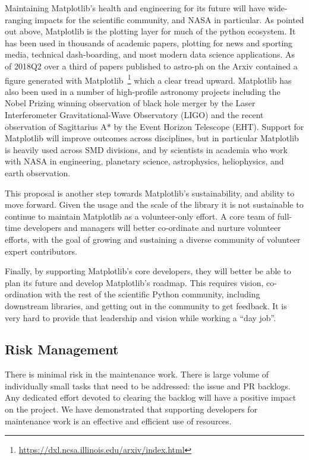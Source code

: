 \documentclass[12pt]{article}
\numberwithin{page}{section}
\begin{document}
Maintaining Matplotlib's health and engineering for its future will
have wide-ranging impacts for the scientific community, and NASA in
particular.  As pointed out above, Matplotlib is the plotting layer
for much of the python ecosystem.  It has been used in thousands of
academic papers, plotting for news and sporting media, technical
dash-boarding, and most modern data science applications.  As of
2018Q2 over a third of papers published to astro-ph on the Arxiv
contained a figure generated with
Matplotlib~\footnote{\url{https://dxl.ncsa.illinois.edu/arxiv/index.html}}
which a clear tread upward.  Matplotlib has also been used in a number
of high-profile astronomy projects including the Nobel Prizing winning
observation of black hole merger by the Laser Interferometer
Gravitational-Wave Observatory (LIGO) and the recent observation of
Sagittarius A* by the Event Horizon Telescope (EHT).  Support for
Matplotlib will improve outcomes across disciplines, but in particular
Matplotlib is heavily used across SMD divisions, and by scientists in
academia who work with NASA in engineering, planetary science,
astrophysics, heliophysics, and earth observation.

This proposal is another step towards Matplotlib's sustainability, and
ability to move forward. Given the usage and the scale of the library
it is not sustainable to continue to maintain Matplotlib as a
volunteer-only effort.  A core team of full-time developers and
managers will better co-ordinate and nurture volunteer efforts, with
the goal of growing and sustaining a diverse community of volunteer
expert contributors.

Finally, by supporting Matplotlib's core developers, they
will better be able to plan its future and develop Matplotlib's roadmap.
This requires vision, co-ordination with the rest of the scientific
Python community, including downstream libraries, and getting out in
the community to get feedback.  It is very hard to provide that
leadership and vision while working a ``day job''.


\subsection{Risk Management}

There is minimal risk in the maintenance work.  There is large volume
of individually small tasks that need to be addressed: the issue and
PR backlogs.  Any dedicated effort devoted to clearing the backlog
will have a positive impact on the project.  We have demonstrated that
supporting developers for maintenance work is an effective and
efficient use of resources.
\end{document}
